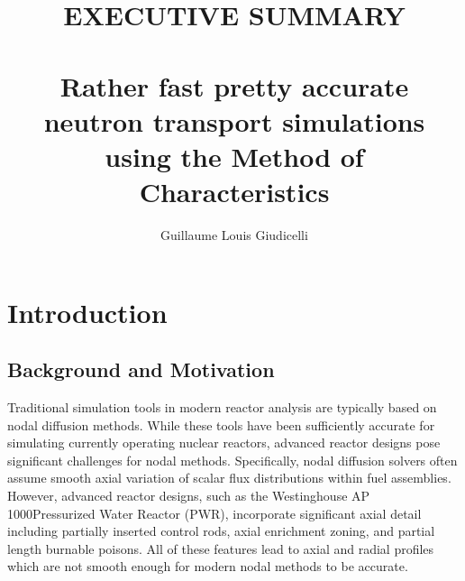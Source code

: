 \documentclass[12pt,twoside]{mitthesis-exec}
\begin{document}



\title{EXECUTIVE SUMMARY \\~\\ Rather fast pretty accurate neutron transport simulations using the Method of Characteristics}

\author{Guillaume Louis Giudicelli}








\singlespacing 

\section*{Introduction}

\subsection*{Background and Motivation}

Traditional simulation tools in modern reactor analysis are typically based on nodal diffusion methods. While these tools have been sufficiently accurate for simulating currently operating nuclear reactors, advanced reactor designs pose significant challenges for nodal methods. Specifically, nodal diffusion solvers often assume smooth axial variation of scalar flux distributions within fuel assemblies. However, advanced reactor designs, such as the Westinghouse AP 1000\texttrademark Pressurized Water Reactor (PWR), incorporate significant axial detail including partially inserted control rods, axial enrichment zoning, and partial length burnable poisons. All of these features lead to axial and radial profiles which are not smooth enough for modern nodal methods to be accurate.
\end{document}
